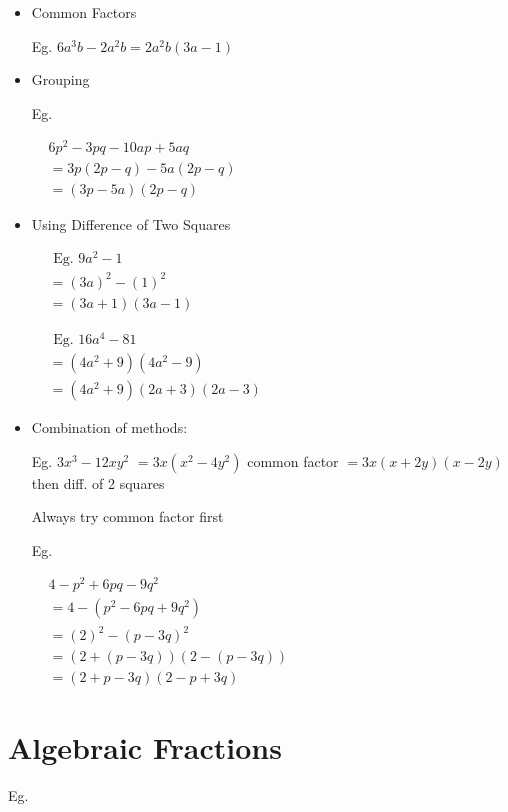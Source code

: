 \documentclass[twocolumn]{article}
\begin{document}
\begin{itemize} 
\item Common Factors

Eg. $6 a^3 b-2 a^2 b=2 a^2 b(3 a-1)$

\item Grouping

Eg.

$
\begin{aligned}
	& 6 p^2-3 p q-10 a p+5 a q \\
	& =3 p(2 p-q)-5 a(2 p-q) \\
	& =(3 p-5 a)(2 p-q)
\end{aligned}
$

\item Using Difference of Two Squares

$
\begin{aligned}
	& \text { Eg. } 9 a^2-1 \\
	& =(3a)^2 - (1)^2 \\
	& =(3 a+1)(3 a-1)
\end{aligned}
$

\noindent 
$
\begin{aligned}
	& \text { Eg. } 16 a^4-81 \\
	& =(4a^2+9)(4a^2-9) \\
	& =(4a^2+9)(2a+3)(2a-3)
\end{aligned}
$

\item Combination of methods:

Eg. $3 x^3-12 x y^2$
$=3 x\left(x^2-4 y^2\right)$ common factor
$=3 x(x+2 y)(x-2 y)$ then diff. of 2 squares

Always try common factor first

Eg.

$
\begin{aligned}
	& 4 - p^2 + 6pq - 9q^2  \\
	& =4 - (p^2 - 6pq + 9q^2) \\
	& =(2)^2 - (p-3q)^2 \\
	& =(2+(p-3q))(2-(p-3q)) \\
	& =(2+p-3q)(2-p+3q)
\end{aligned}
$

\end{itemize} 

\section*{Algebraic Fractions}

\noindent 
Eg.
\end{document}
